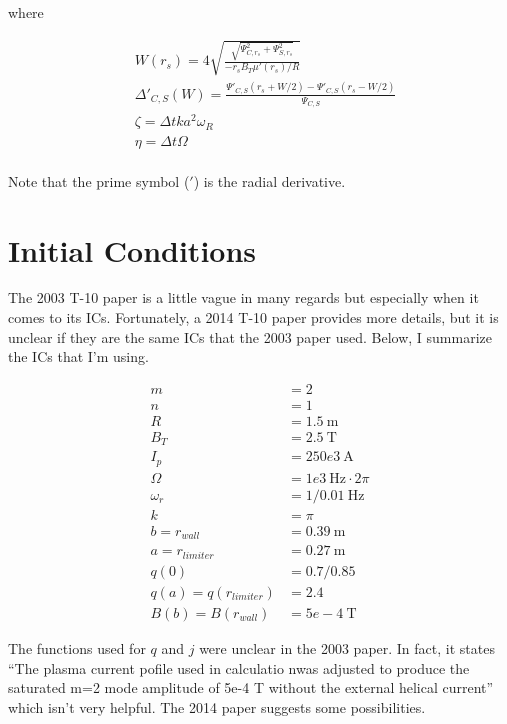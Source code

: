 \documentclass{article}
\begin{document}
where



\begin{equation} \label{eq3}
\begin{split}
 & W(r_s) = 4 \sqrt{\frac{\sqrt{\Psi^2_{C,r_s} + \Psi^2_{S,r_s}}}{-r_sB_T\mu'(r_s)/R} }\\
  & \Delta'_{C,S}(W)=\frac{\Psi'_{C,S}(r_s+W/2)-\Psi'_{C,S}(r_s-W/2)}{\Psi_{C,S}} \\
  & \zeta = \Delta t k a^2 \omega_R \\
  & \eta =  \Delta t \Omega \\
\end{split} 
\end{equation} 

Note that the prime symbol ($'$) is the radial derivative.  


\section{Initial Conditions}

The 2003 T-10 paper is a little vague in many regards but especially when it comes to its ICs.  Fortunately, a 2014 T-10 paper provides more details, but it is unclear if they are the same ICs that the 2003 paper used.  Below, I summarize the ICs that I'm using. 

\begin{equation} \label{ICConstants}
\begin{split}
m &= 2 \\
n &= 1 \\
R &= 1.5 \ \text{m}\\
B_T &= 2.5 \ \text{T} \\
I_p &= 250e3 \ \text{A}\\
\Omega & =1e3 \ \text{Hz} \cdot 2 \pi \\
\omega_r & = 1/0.01 \ \text{Hz} \\
k &= \pi \\
b = r_{wall} & = 0.39 \ \text{m} \\
a = r_{limiter} & = 0.27 \ \text{m} \\
q(0) &= 0.7/0.85 \\
q(a) = q(r_{limiter}) &= 2.4 \\
B(b) = B(r_{wall}) & = 5e-4 \ \text{T}
\end{split} 
\end{equation} 

The functions used for $q$ and $j$ were unclear in the 2003 paper.  In fact, it states ``The plasma current pofile used in calculatio nwas adjusted to produce the saturated m=2 mode amplitude of 5e-4 T without the external helical current'' which isn't very helpful.  The 2014 paper suggests some possibilities.  
\end{document}
